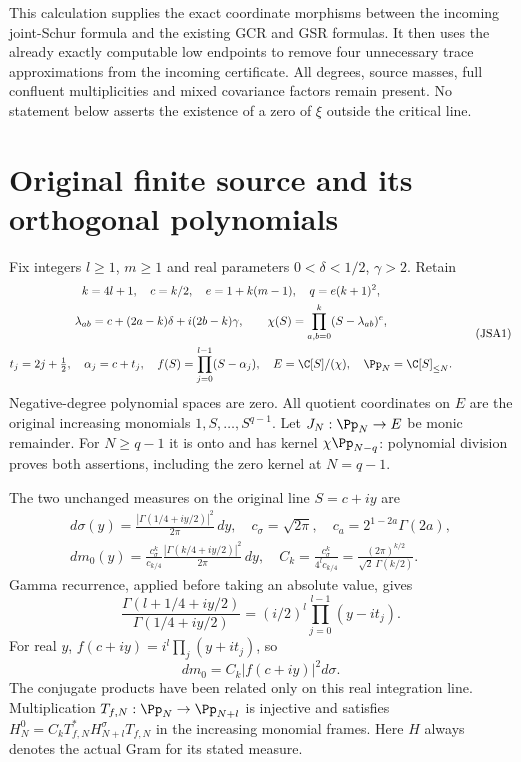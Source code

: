 This calculation supplies the exact coordinate morphisms between the
incoming joint-Schur formula and the existing GCR and GSR formulas.
It then uses the already exactly computable low endpoints to remove
four unnecessary trace approximations from the incoming certificate.
All degrees, source masses, full confluent multiplicities and mixed
covariance factors remain present. No statement below asserts the
existence of a zero of $\xi$ outside the critical line.

\section{Original finite source and its orthogonal polynomials}

Fix integers $l\geq1$, $m\geq1$ and real parameters
$0<\delta<1/2$, $\gamma>2$. Retain
\[
\begin{gathered}
 k=4l+1,\quad c=k/2,\quad e=1+k(m-1),\quad q=e(k+1)^2,\\
 \lambda_{ab}=c+(2a-k)\delta+i(2b-k)\gamma,\qquad
 \chi(S)=\prod_{a,b=0}^k(S-\lambda_{ab})^e,\\
 t_j=2j+\tfrac12,\quad \alpha_j=c+t_j,\quad
 f(S)=\prod_{j=0}^{l-1}(S-\alpha_j),\quad
 E=\C[S]/(\chi),\quad \Pp_N=\C[S]_{\leq N}.
\end{gathered}\tag{JSA1}
\]
Negative-degree polynomial spaces are zero. All quotient coordinates
on $E$ are the original increasing monomials $1,S,\ldots,S^{q-1}$.
Let $J_N:\Pp_N\to E$ be monic remainder. For $N\geq q-1$ it
is onto and has kernel $\chi\Pp_{N-q}$: polynomial division proves
both assertions, including the zero kernel at $N=q-1$.

The two unchanged measures on the original line $S=c+iy$ are
\[
\begin{gathered}
 d\sigma(y)=\frac{|\Gamma(1/4+iy/2)|^2}{2\pi}\,dy,
 \quad c_\sigma=\sqrt{2\pi},\quad c_a=2^{1-2a}\Gamma(2a),\\
 dm_0(y)=\frac{c_\sigma^k}{c_{k/4}}
       \frac{|\Gamma(k/4+iy/2)|^2}{2\pi}\,dy,
 \quad C_k=\frac{c_\sigma^k}{4^l c_{k/4}}
          =\frac{(2\pi)^{k/2}}{\sqrt2\,\Gamma(k/2)}.
\end{gathered}\tag{JSA2}
\]
Gamma recurrence, applied before taking an absolute value, gives
\[
 \frac{\Gamma(l+1/4+iy/2)}{\Gamma(1/4+iy/2)}
  =(i/2)^l\prod_{j=0}^{l-1}(y-it_j).
\]
For real $y$, $f(c+iy)=i^l\prod_j(y+it_j)$, so
\[
 dm_0=C_k|f(c+iy)|^2d\sigma.\tag{JSA3}
\]
The conjugate products have been related only on this real integration
line. Multiplication $T_{f,N}:\Pp_N\to\Pp_{N+l}$ is injective
and satisfies $H_N^0=C_kT_{f,N}^*H_{N+l}^\sigma T_{f,N}$ in
the increasing monomial frames. Here $H$ always denotes the actual
Gram for its stated measure.

